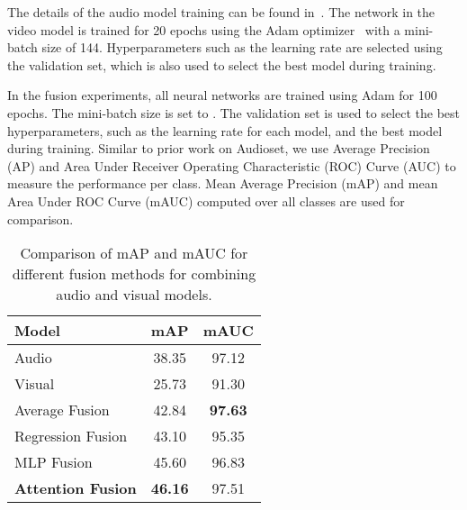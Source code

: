 \documentclass{article}
\begin{document}
The details of the audio model training can be found in~\cite{kumar2019secost}. 
The network in the video model is trained for 20 epochs using the Adam optimizer~\cite{Kingma2014} with a mini-batch size of 144. Hyperparameters such as the learning rate are selected using the validation set, which is also used to select the best model during training. 

In the fusion experiments, all neural networks are trained using Adam for 100 epochs.
The mini-batch size is set to .
The validation set is used to select the best hyperparameters, such as the learning rate for each model, and the best model during training.
Similar to prior work on Audioset, we use Average Precision (AP) and Area Under Receiver Operating Characteristic (ROC) Curve (AUC) to measure the performance per class.
Mean Average Precision (mAP) and mean Area Under ROC Curve (mAUC) computed over all  classes are used for comparison.

\begin{table}[t]
	\centering
	\begin{tabular}{l|c|c}
		\toprule
		Model                     & mAP            & mAUC           \\
		\midrule
		Audio                     & 38.35          & 97.12          \\
		Visual                    & 25.73          & 91.30          \\
		\midrule
		Average Fusion            & 42.84          & \textbf{97.63} \\
		Regression Fusion         & 43.10          & 95.35          \\
		MLP Fusion                & 45.60          & 96.83          \\
		\midrule
		\textbf{Attention Fusion} & \textbf{46.16} & 97.51          \\
		\bottomrule
	\end{tabular}
	\caption{Comparison of mAP and mAUC for different fusion methods for combining audio and visual models.}\label{tab:results}
\end{table}
\end{document}
